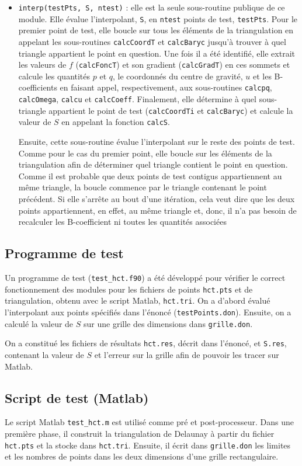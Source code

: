\documentclass[12 pt]{article}
\begin{document}
\begin{itemize}
	\item \texttt{interp(testPts, S, ntest)} : elle est la seule sous-routine publique de ce module. Elle évalue l'interpolant, \texttt{S}, en \texttt{ntest} points de test, \texttt{testPts}. Pour le premier point de test, elle boucle sur tous les éléments de la triangulation en appelant les sous-routines \texttt{calcCoordT} et \texttt{calcBaryc} jusqu'à trouver à quel triangle appartient le point en question. Une fois il a été identifié, elle extrait les valeurs de $f$ (\texttt{calcFoncT}) et son gradient (\texttt{calcGradT}) en ces sommets et calcule les quantités $p$ et $q$, le coordonnés du centre de gravité, $u$ et les B-coefficients en faisant appel, respectivement, aux sous-routines \texttt{calcpq}, \texttt{calcOmega}, \texttt{calcu} et \texttt{calcCoeff}. Finalement, elle détermine à quel sous-triangle appartient le point de test (\texttt{calcCoordTi} et \texttt{calcBaryc}) et calcule la valeur de $S$ en appelant la fonction \texttt{calcS}.
	
	Ensuite, cette sous-routine évalue l'interpolant sur le reste des points de test. Comme pour le cas du premier point, elle boucle sur les éléments de la triangulation afin de déterminer quel triangle contient le point en question. Comme il est probable que deux points de test contigus appartiennent au même triangle, la boucle commence par le triangle contenant le point précédent. Si elle s'arrête au bout d'une itération, cela veut dire que les deux points appartiennent, en effet, au même triangle et, donc, il n'a pas besoin de recalculer les B-coefficient ni toutes les quantités associées
\end{itemize}
\subsection{Programme de test}
Un programme de test (\texttt{test\_hct.f90}) a été développé pour vérifier le correct fonctionnement des modules pour les fichiers de points \texttt{hct.pts} et de triangulation, obtenu avec le script Matlab, \texttt{hct.tri}. On a d'abord évalué l'interpolant aux points spécifiés dans l'énoncé (\texttt{testPoints.don}). Ensuite, on a calculé la valeur de $S$ sur une grille des dimensions dans \texttt{grille.don}.

On a constitué les fichiers de résultats \texttt{hct.res}, décrit dans l'énoncé, et \texttt{S.res}, contenant la valeur de $S$ et l'erreur sur la grille afin de pouvoir les tracer sur Matlab.
\subsection{Script de test (Matlab)}
Le script Matlab \texttt{test\_hct.m} est utilisé comme pré et post-processeur. Dans une première phase, il construit la triangulation de Delaunay à partir du fichier \texttt{hct.pts} et la stocke dans \texttt{hct.tri}. Ensuite, il écrit dans \texttt{grille.don} les limites et les nombres de points dans les deux dimensions d'une grille rectangulaire. 
\end{document}
